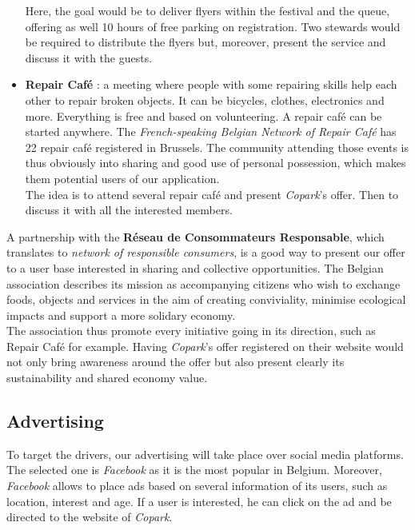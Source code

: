 \documentclass[12pt,a4paper,oneside]{book}
\newcommand{\bp}{\textit{Copark}}
\begin{document}
\begin{itemize}
Here, the goal would be to deliver flyers within the festival and the queue, offering as well 10 hours of free parking on registration. Two stewards would be required to distribute the flyers but, moreover, present the service and discuss it with the guests.
\item \textbf{Repair Café} : a meeting where people with some repairing skills help each other to repair broken objects. It can be bicycles, clothes, electronics and more. Everything is free and based on volunteering. A repair café can be started anywhere. The \textit{French-speaking Belgian Network of Repair Café} has 22 repair café registered in Brussels.\cite{repair} The community attending those events is thus obviously into sharing and good use of personal possession, which makes them potential users of our application.\\
The idea is to attend several repair café and present \bp{}'s offer. Then to discuss it with all the interested members.
\end{itemize}

A partnership with the \textbf{Réseau de Consommateurs Responsable}, which translates to \textit{network of responsible consumers}, is a good way to present our offer to a user base interested in sharing and collective opportunities. The Belgian association describes its mission as accompanying citizens who wish to exchange foods, objects and services in the aim of creating conviviality, minimise ecological impacts and support a more solidary economy.\cite{rcr}\\

The association thus promote every initiative going in its direction, such as Repair Café for example. Having \bp{}'s offer registered on their website would not only bring awareness around the offer but also present clearly its sustainability and shared economy value.

\subsection{Advertising}
To target the drivers, our advertising will take place over social media platforms. The selected one is \textit{Facebook} as it is the most popular in Belgium.\cite{smstat} Moreover, \textit{Facebook} allows to place ads based on several information of its users, such as location, interest and age. If a user is interested, he can click on the ad and be directed to the website of \bp{}.\\
\end{document}
